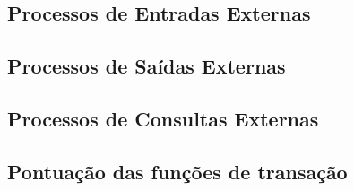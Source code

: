   \subsection{Processos de Entradas Externas}
  
    
  
  \subsection{Processos de Saídas Externas}
    
    

  \subsection{Processos de Consultas Externas}
    
    
    
    
\vfill
\pagebreak
  \subsection{Pontuação das funções de transação}
    
